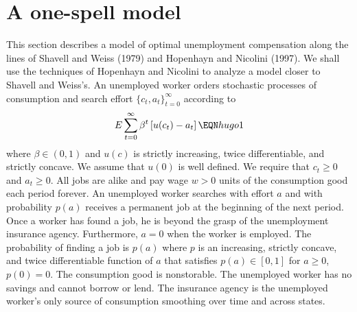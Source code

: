 \section{A one-spell model}
This section describes a model of optimal unemployment
compensation along the lines of Shavell and Weiss (1979) and
Hopenhayn and Nicolini (1997). We shall use the techniques of
Hopenhayn and Nicolini to analyze a model closer to Shavell and
Weiss's. An unemployed worker orders stochastic processes of
consumption and  search effort $\{c_t , a_t\}_{t=0}^\infty$
according to
$$ E \sum_{t=0}^\infty \beta^t \left[ u(c_t) - a_t \right] \EQN hugo1 $$
where $\beta \in (0,1)$ and
$u(c)$ is strictly increasing, twice differentiable,
and strictly concave.  We assume that $u(0)$ is well defined.
  We require
that $c_t \geq 0$ and $ a_t \geq 0$.
    All jobs are alike and pay wage
$w >0$ units of the consumption good each period forever. An unemployed
worker searches with effort $a$ and with probability
$p(a)$ receives a permanent job at the beginning
of the next period. Once
a worker has found a job, he is beyond the grasp
of the unemployment insurance agency.
Furthermore, $a=0$ when the worker is
employed.  The probability
of finding a job  is $p(a)$ where $p$ is an increasing, strictly concave,
 and twice differentiable function of $a$ that satisfies
$p(a)   \in [0,1]$ for  $a \geq 0$, $p(0)=0$.
The consumption good is nonstorable.
 The unemployed worker has no savings and cannot borrow or lend.
The  insurance agency is the unemployed worker's only source of consumption
smoothing over time and across states.


